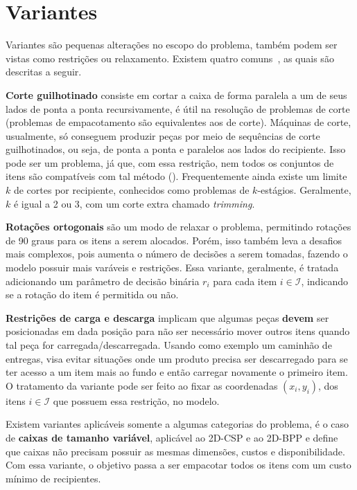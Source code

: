 \section{Variantes}\label{sec:variantes}


Variantes são pequenas alterações no escopo do problema, também podem ser vistas como restrições
ou relaxamento.
Existem quatro comuns~\cite{2DPackLib,exact-solution-techniques}, as quais são descritas a seguir.

\textbf{Corte guilhotinado} consiste em cortar a caixa de forma paralela a um de seus lados de ponta
a ponta recursivamente, é útil na resolução de problemas de corte (problemas de empacotamento
são equivalentes aos de corte).
Máquinas de corte, usualmente, só conseguem produzir peças por meio de sequências de corte
guilhotinados, ou seja, de ponta a ponta e paralelos aos lados do recipiente.
Isso pode ser um problema, já que, com essa restrição, nem todos os conjuntos de itens são
compatíveis com tal método ().
Frequentemente ainda existe um limite $k$ de cortes por recipiente, conhecidos como problemas de
$k$-estágios.
Geralmente, $k$ é igual a 2 ou 3, com um corte extra chamado \textit{trimming}.



\textbf{Rotações ortogonais} são um modo de relaxar o problema, permitindo rotações de 90 graus
para os itens a serem alocados.
Porém, isso também leva a desafios mais complexos, pois aumenta o número de decisões a serem tomadas,
fazendo o modelo possuir mais varáveis e restrições.
Essa variante, geralmente, é tratada adicionando um parâmetro de decisão binária $r_i$ para cada
item $i \in \mathcal{I}$, indicando se a rotação do item é permitida ou não.

\textbf{Restrições de carga e descarga} implicam que algumas peças \textbf{devem} ser posicionadas
em dada posição para não ser necessário mover outros itens quando tal peça for carregada/descarregada.
Usando como exemplo um caminhão de entregas, visa evitar situações onde um produto
precisa ser descarregado para se ter acesso a um item mais ao fundo e então carregar novamente o
primeiro item.
O tratamento da variante pode ser feito ao fixar as coordenadas $(x_i, y_i)$, dos itens
$i \in \mathcal{I}$ que possuem essa restrição, no modelo.

Existem variantes aplicáveis somente a algumas categorias do problema, é o caso de \textbf{caixas
de tamanho variável}, aplicável ao 2D-CSP e ao 2D-BPP e define que caixas
não precisam possuir as mesmas dimensões, custos e disponibilidade.
Com essa variante, o objetivo passa a ser empacotar todos os itens com um custo mínimo de recipientes.
